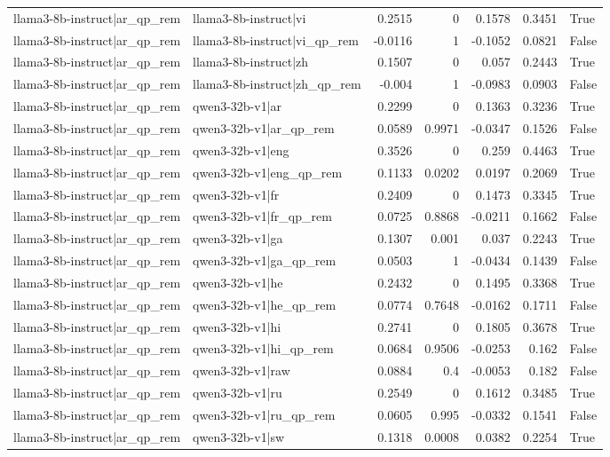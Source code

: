 \begin{table}
\begin{tabular}{l l r r r r l}
llama3-8b-instruct|ar_qp_rem & llama3-8b-instruct|vi & 0.2515 & 0 & 0.1578 & 0.3451 & True \\
llama3-8b-instruct|ar_qp_rem & llama3-8b-instruct|vi_qp_rem & -0.0116 & 1 & -0.1052 & 0.0821 & False \\
llama3-8b-instruct|ar_qp_rem & llama3-8b-instruct|zh & 0.1507 & 0 & 0.057 & 0.2443 & True \\
llama3-8b-instruct|ar_qp_rem & llama3-8b-instruct|zh_qp_rem & -0.004 & 1 & -0.0983 & 0.0903 & False \\
llama3-8b-instruct|ar_qp_rem & qwen3-32b-v1|ar & 0.2299 & 0 & 0.1363 & 0.3236 & True \\
llama3-8b-instruct|ar_qp_rem & qwen3-32b-v1|ar_qp_rem & 0.0589 & 0.9971 & -0.0347 & 0.1526 & False \\
llama3-8b-instruct|ar_qp_rem & qwen3-32b-v1|eng & 0.3526 & 0 & 0.259 & 0.4463 & True \\
llama3-8b-instruct|ar_qp_rem & qwen3-32b-v1|eng_qp_rem & 0.1133 & 0.0202 & 0.0197 & 0.2069 & True \\
llama3-8b-instruct|ar_qp_rem & qwen3-32b-v1|fr & 0.2409 & 0 & 0.1473 & 0.3345 & True \\
llama3-8b-instruct|ar_qp_rem & qwen3-32b-v1|fr_qp_rem & 0.0725 & 0.8868 & -0.0211 & 0.1662 & False \\
llama3-8b-instruct|ar_qp_rem & qwen3-32b-v1|ga & 0.1307 & 0.001 & 0.037 & 0.2243 & True \\
llama3-8b-instruct|ar_qp_rem & qwen3-32b-v1|ga_qp_rem & 0.0503 & 1 & -0.0434 & 0.1439 & False \\
llama3-8b-instruct|ar_qp_rem & qwen3-32b-v1|he & 0.2432 & 0 & 0.1495 & 0.3368 & True \\
llama3-8b-instruct|ar_qp_rem & qwen3-32b-v1|he_qp_rem & 0.0774 & 0.7648 & -0.0162 & 0.1711 & False \\
llama3-8b-instruct|ar_qp_rem & qwen3-32b-v1|hi & 0.2741 & 0 & 0.1805 & 0.3678 & True \\
llama3-8b-instruct|ar_qp_rem & qwen3-32b-v1|hi_qp_rem & 0.0684 & 0.9506 & -0.0253 & 0.162 & False \\
llama3-8b-instruct|ar_qp_rem & qwen3-32b-v1|raw & 0.0884 & 0.4 & -0.0053 & 0.182 & False \\
llama3-8b-instruct|ar_qp_rem & qwen3-32b-v1|ru & 0.2549 & 0 & 0.1612 & 0.3485 & True \\
llama3-8b-instruct|ar_qp_rem & qwen3-32b-v1|ru_qp_rem & 0.0605 & 0.995 & -0.0332 & 0.1541 & False \\
llama3-8b-instruct|ar_qp_rem & qwen3-32b-v1|sw & 0.1318 & 0.0008 & 0.0382 & 0.2254 & True \\

\end{tabular}
\end{table}
